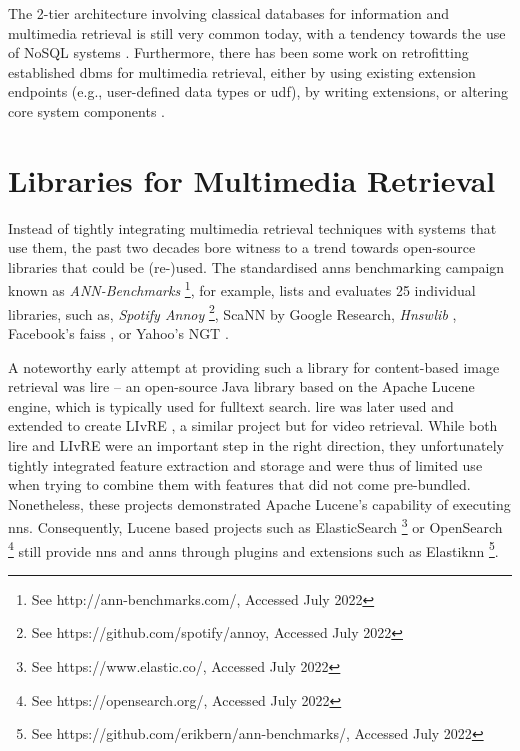 The 2-tier architecture involving classical databases for information and multimedia retrieval is still very common today, with a tendency towards the use of NoSQL systems \cite{Muhleisen:2014Old,Oliveira:2017Performance}. Furthermore, there has been some work on retrofitting established \acrshort{dbms} for multimedia retrieval, either by using existing extension endpoints (e.g., user-defined data types or \acrfull{udf}), by writing extensions, or altering core system components \cite{Guliato:2009PostgreSQL,Whang:2010Tightly,Giangreco:2014Adam,Fleites:2013Efficient,Whang:2015DB,Yang:2020Pase}.

\section{Libraries for Multimedia Retrieval}
\label{section:nns_libraries}

Instead of tightly integrating multimedia retrieval techniques with systems that use them, the past two decades bore witness to a trend towards open-source libraries that could be (re-)used. The standardised \acrshort{anns} benchmarking campaign known as \emph{ANN-Benchmarks} \cite{Aumueller:2017ANN} \footnote{See http://ann-benchmarks.com/, Accessed July 2022}, for example, lists and evaluates 25 individual libraries, such as, \emph{Spotify Annoy} \footnote{See https://github.com/spotify/annoy, Accessed July 2022}, ScaNN \cite{Guo:2020Accelerating} by Google Research, \emph{Hnswlib} \cite{Malkov:2018Efficient}, Facebook's \acrshort{faiss} \cite{Johnson:2019Billion}, or Yahoo's NGT \cite{Iwasaki2016:Pruned}.

A noteworthy early attempt at providing such a library for content-based image retrieval was \acrfull{lire} \cite{Luc:2008LIRE} -- an open-source Java library based on the Apache Lucene engine, which is typically used for fulltext search. \acrshort{lire} was later used and extended to create LIvRE \cite{Oliveira:2016Large}, a similar project but for video retrieval. While both \acrshort{lire} and LIvRE were an important step in the right direction, they unfortunately tightly integrated feature extraction and storage and were thus of limited use when trying to combine them with features that did not come pre-bundled. Nonetheless, these projects demonstrated Apache Lucene's capability of executing \acrshort{nns}. Consequently, Lucene based projects such as ElasticSearch \footnote{See https://www.elastic.co/, Accessed July 2022} or OpenSearch \footnote{See https://opensearch.org/, Accessed July 2022} still provide \acrshort{nns} and \acrshort{anns} through plugins and extensions such as Elastiknn \footnote{See https://github.com/erikbern/ann-benchmarks/, Accessed July 2022}.

